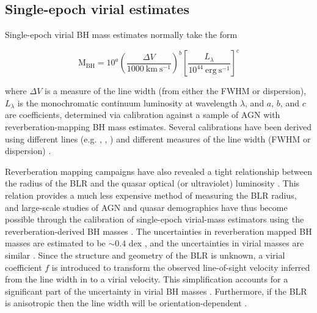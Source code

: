 \subsection{Single-epoch virial estimates}

Single-epoch virial BH mass estimates normally take the form

\begin{equation}
  \label{eq:virialmass}
  \mathrm{M_{BH}} = 10^{a} \left( \frac{\Delta V}{1000~\mathrm{km~s^{-1}}} \right)^b \left[ \frac{L_{\lambda}}{10^{44}~\mathrm{erg~s^{-1}}} \right]^c
\end{equation}

\noindent where $\Delta V$ is a measure of the line width (from either the FWHM or dispersion), $L_\lambda$ is the monochromatic continuum luminosity at wavelength $\lambda$, and $a$, $b$, and $c$ are coefficients, determined via calibration against a sample of AGN with reverberation-mapping BH mass estimates. Several calibrations have been derived using different lines (e.g. \hbns, , ) and different measures of the line width (FWHM or dispersion) \citep[e.g.][]{vestergaard02,mclure02,vestergaard06,mcgill08,wang09,rafiee11,park13}.

Reverberation mapping campaigns have also revealed a tight relationship between the radius of the BLR and the quasar optical (or ultraviolet) luminosity \citep[the $R-L$ relation; e.g.][]{kaspi00,kaspi07}.
This relation provides a much less expensive method of measuring the BLR radius, and large-scale studies of AGN and quasar demographics have thus become possible through the calibration of single-epoch virial-mass estimators using the reverberation-derived BH masses \citep[e.g.][]{greene05b,vestergaard06,vestergaard09,shen11,shen12,trakhtenbrot12}.
The uncertainties in reverberation mapped BH masses are estimated to be $\sim 0.4$ dex \citep[e.g.][]{peterson10}, and the uncertainties in virial masses are similar \citep[e.g.][]{vestergaard06}.
Since the structure and geometry of the BLR is unknown, a virial coefficient $f$ is introduced to transform the observed line-of-sight velocity inferred from the line width in to a virial velocity.
This simplification accounts for a significant part of the uncertainty in virial BH masses \citep[in addition to, for example, describing the BLR with a single radius $R$ and scatter in the $R-L$ relation;][]{shen13}. 
Furthermore, if the BLR is anisotropic \citep[for example, in a flattened disk; e.g.][]{jarvis06} then the line width will be orientation-dependent \citep[e.g.][]{runnoe13b,shen14,brotherton15}. 

